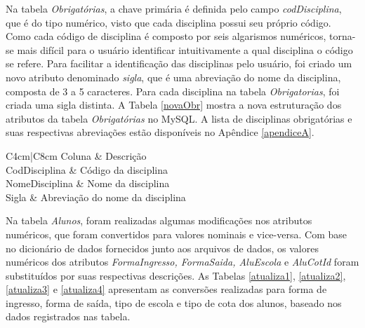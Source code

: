 Na tabela \textit{Obrigatórias}, a chave primária é definida pelo campo \textit{codDisciplina}, que é do tipo numérico, visto que cada disciplina possui seu próprio código. Como cada código de disciplina é composto por seis algarismos numéricos, torna-se mais difícil para o usuário identificar intuitivamente a qual disciplina o código se refere. Para facilitar a identificação das disciplinas pelo usuário, foi criado um novo atributo denominado \textit{sigla}, que é uma abreviação do nome da disciplina, composta de 3 a 5 caracteres. Para cada disciplina na tabela \textit{Obrigatorias}, foi criada uma sigla distinta. A Tabela \ref{novaObr} mostra a nova estruturação dos atributos da tabela \textit{Obrigatórias} no MySQL. A lista de disciplinas obrigatórias e suas respectivas abreviações estão disponíveis no Apêndice \ref{apendiceA}.

\begin{table}[!h]
		\caption{Nova estrutura da tabela \textit{Obrigatórias}.} 	\label{novaObr}
		\centering
	\begin{tabular}{C{4cm}|C{8cm}}
	\hline
	Coluna & Descrição\\
	\hline
	CodDisciplina & Código da disciplina\\
	NomeDisciplina & Nome da disciplina\\
	Sigla & Abreviação do nome da disciplina\\	
	\hline
		\end{tabular}
\end{table}


Na tabela \textit{Alunos}, foram realizadas algumas modificações nos atributos numéricos, que foram convertidos para valores nominais e vice-versa. Com base no dicionário de dados fornecidos junto aos arquivos de dados, os valores numéricos dos atributos \textit{FormaIngresso, FormaSaida, AluEscola} e \textit{AluCotId} foram substituídos por suas respectivas descrições. As Tabelas \ref{atualiza1}, \ref{atualiza2}, \ref{atualiza3} e \ref{atualiza4} apresentam as conversões realizadas para forma de ingresso, forma de saída, tipo de escola e tipo de cota dos alunos, baseado nos dados registrados nas tabela.

